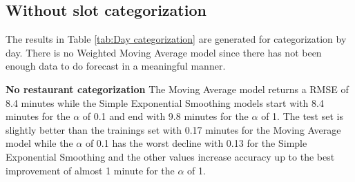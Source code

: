 \subsection{Without slot categorization}
The results in Table \ref{tab:Day categorization} are generated for categorization by day. There is no Weighted Moving Average model since there has not been enough data to do forecast in a meaningful manner.
\begin{table}[h]
\centering
\caption{Day categorization without slots}
\label{tab:Day categorization}
\end{table}
\newline\newline\textbf{No restaurant categorization}\newline
The Moving Average model returns a RMSE of 8.4 minutes while the Simple Exponential Smoothing models start with 8.4 minutes for the $\alpha$ of 0.1 and end with 9.8 minutes for the $\alpha$ of 1. The test set is slightly better than the trainings set with 0.17 minutes for the Moving Average model while the $\alpha$ of 0.1 has the worst decline with 0.13 for the Simple Exponential Smoothing and the other values increase accuracy up to the best improvement of almost 1 minute for the $\alpha$ of 1.\newline
